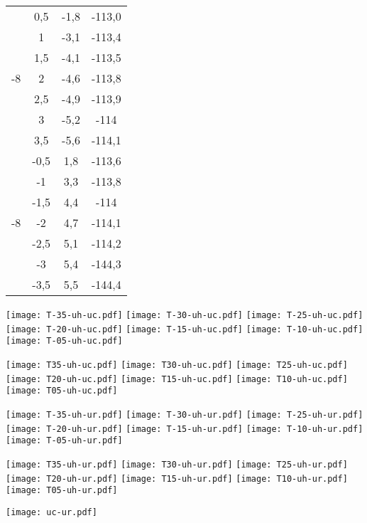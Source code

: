 \documentclass[11pt]{article}
\begin{document}
\begin{multicols}{2}
\begin{tabular}{|c|c|c|c|}
\multirow{7}{*}{-8} & 0,5 & -1,8 & -113,0 \\
& 1   & -3,1 & -113,4 \\
& 1,5 & -4,1 & -113,5 \\
& 2   & -4,6 & -113,8 \\
& 2,5 & -4,9 & -113,9 \\
& 3   & -5,2 & -114 \\
& 3,5 & -5,6 & -114,1 \\
\hline
\multirow{7}{*}{-8} & -0,5 & 1,8 & -113,6 \\
& -1   & 3,3 & -113,8 \\
& -1,5 & 4,4 & -114 \\
& -2   & 4,7 & -114,1 \\
& -2,5 & 5,1 & -114,2 \\
& -3   & 5,4 & -144,3 \\
& -3,5 & 5,5 & -144,4 \\
\hline
 
\end{tabular}

\end{multicols}
\newpage

\begin{multicols}{2}

\texttt{[image: T-35-uh-uc.pdf]}
\texttt{[image: T-30-uh-uc.pdf]}
\texttt{[image: T-25-uh-uc.pdf]}
\texttt{[image: T-20-uh-uc.pdf]}
\texttt{[image: T-15-uh-uc.pdf]}
\texttt{[image: T-10-uh-uc.pdf]}
\texttt{[image: T-05-uh-uc.pdf]}

\texttt{[image: T35-uh-uc.pdf]}
\texttt{[image: T30-uh-uc.pdf]}
\texttt{[image: T25-uh-uc.pdf]}
\texttt{[image: T20-uh-uc.pdf]}
\texttt{[image: T15-uh-uc.pdf]}
\texttt{[image: T10-uh-uc.pdf]}
\texttt{[image: T05-uh-uc.pdf]}

\texttt{[image: T-35-uh-ur.pdf]}
\texttt{[image: T-30-uh-ur.pdf]}
\texttt{[image: T-25-uh-ur.pdf]}
\texttt{[image: T-20-uh-ur.pdf]}
\texttt{[image: T-15-uh-ur.pdf]}
\texttt{[image: T-10-uh-ur.pdf]}
\texttt{[image: T-05-uh-ur.pdf]}

\texttt{[image: T35-uh-ur.pdf]}
\texttt{[image: T30-uh-ur.pdf]}
\texttt{[image: T25-uh-ur.pdf]}
\texttt{[image: T20-uh-ur.pdf]}
\texttt{[image: T15-uh-ur.pdf]}
\texttt{[image: T10-uh-ur.pdf]}
\texttt{[image: T05-uh-ur.pdf]}

\texttt{[image: uc-ur.pdf]}

\end{multicols}
\end{document}

